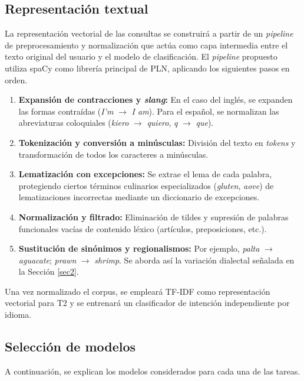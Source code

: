 \documentclass[11pt,a4paper,twoside]{article}
\theoremstyle{definition}
\numberwithin{equation}{section}
\begin{document}
\subsection{Representación textual} \label{sec7_1}
La representación vectorial de las consultas se construirá a partir de un \textit{pipeline} de preprocesamiento y normalización que actúa como capa intermedia entre el texto original del usuario y el modelo de clasificación. El \textit{pipeline} propuesto utiliza spaCy como librería principal de PLN, aplicando los siguientes pasos en orden.
\begin{enumerate}
    \item \textbf{Expansión de contracciones y \textit{slang}:} En el caso del inglés, se expanden las formas contraídas (\textit{I'm} $\rightarrow$ \textit{I am}). %
    Para el español, se normalizan las abreviaturas coloquiales (\textit{kiero} $\rightarrow$ \textit{quiero}, \textit{q} $\rightarrow$ \textit{que}). 
    \item \textbf{Tokenización y conversión a minúsculas:} División del texto en \textit{tokens} y transformación de todos los caracteres a minúsculas.
    \item \textbf{Lematización con excepciones:} Se extrae el lema de cada palabra, protegiendo ciertos términos culinarios especializados (\textit{gluten}, \textit{aove}) de lematizaciones incorrectas mediante un diccionario de excepciones.
    \item \textbf{Normalización y filtrado:} Eliminación de tildes y supresión de palabras funcionales vacías de contenido léxico (artículos, preposiciones, etc.).
	\item \textbf{Sustitución de sinónimos y regionalismos:} Por ejemplo, \textit{palta} $\rightarrow$ \textit{aguacate}; \textit{prawn} $\rightarrow$ \textit{shrimp}. Se aborda así la variación dialectal señalada en la Sección \ref{sec2}.
\end{enumerate}

Una vez normalizado el corpus, se empleará TF-IDF como representación vectorial para T2 y se entrenará un clasificador de intención independiente por idioma. 

\vspace{5pt}
\subsection{Selección de modelos}
A continuación, se explican los modelos considerados para cada una de las tareas. 
\end{document}
